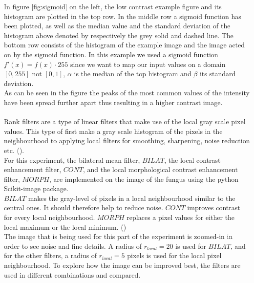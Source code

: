In figure \ref{fig:sigmoid} on the left, the low contrast example figure and its histogram are plotted in the top row. In the middle row a sigmoid function has been plotted, as well as the median value and the standard deviation of the histogram above denoted by respectively the grey solid and dashed line. The bottom row consists of the histogram of the example image and the image acted on by the sigmoid function. In this example we used a sigmoid function $f'(x)=f(x) \cdot 255$ since we want to map our input values on a domain $[0,255]$ not $[0,1]$, $\alpha$ is the median of the top histogram and $\beta$ its standard deviation.\\
As can be seen in the figure the peaks of the most common values of the intensity have been spread further apart thus resulting in a higher contrast image.\\
\\
Rank filters are a type of linear filters that make use of the local gray scale pixel values. This type of first make a gray scale histogram of the pixels in the neighbourhood to applying local filters for smoothing, sharpening, noise reduction etc. (\cite{rank}).  \\
For this experiment, the bilateral mean filter, $BILAT$, the local contrast enhancement filter, $CONT$, and the local morphological contrast enhancement filter, $MORPH$, are implemented on the image of the fungus using the python Scikit-image package.\\
$BILAT$ makes the gray-level of pixels in a local neighbourhood similar to the central ones. It should therefore help to reduce noise. $CONT$ improves contrast for every local neighbourhood. $MORPH$ replaces a pixel values for either the local maximum or the local minimum. (\cite{rank}) \\
The image that is being used for this part of the experiment is zoomed-in in order to see noise and fine details. A radius of $r_{local} = 20$ is used for $BILAT$, and for the other filters, a radius of $r_{local} = 5$ pixels is used for the local pixel neighbourhood. To explore how the image can be improved best, the filters are used in different combinations and compared.

